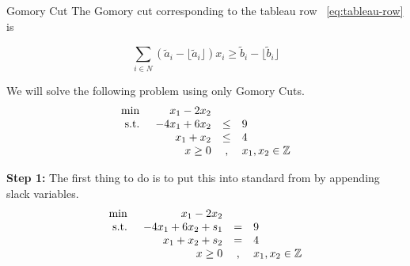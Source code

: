 \documentclass[../open-optimization/open-optimization.tex]{subfiles}
\begin{document}
\begin{general}{Gomory Cut}{}
The Gomory cut corresponding to the tableau row ~\eqref{eq:tableau-row} is

\begin{equation}
\label{eq:gomory-cut}
\sum_{i\in N} (\tilde a_i - \lfloor \tilde a_i \rfloor) x_i \geq \tilde b_i - \lfloor \tilde b_i\rfloor
\end{equation}


\end{general}


We will solve the following problem using only Gomory Cuts.
\begin{equation*}
\begin{array}{lrcl}
\min & x_1 - 2x_2\\
\text{ s.t. } & -4x_1 + 6x_2  & \leq & 9\\
& x_1 + x_2   & \leq & 4\\
& x \geq 0 & , & x_1,x_2 \in {\mathbb{Z}}
\end{array}
\end{equation*}

\textbf{Step 1:} The first thing to do is to put this into standard from by appending slack variables.
\begin{equation}
\label{eq:gomory-standard-form}
\begin{array}{lrcl}
\min & x_1 - 2x_2\\
\text{ s.t. } & -4x_1 + 6x_2 + s_1 & = & 9\\
& x_1 + x_2 + s_2  & = & 4\\
& x \geq 0 & , & x_1,x_2 \in {\mathbb{Z}}
\end{array}
\end{equation}
\end{document}

